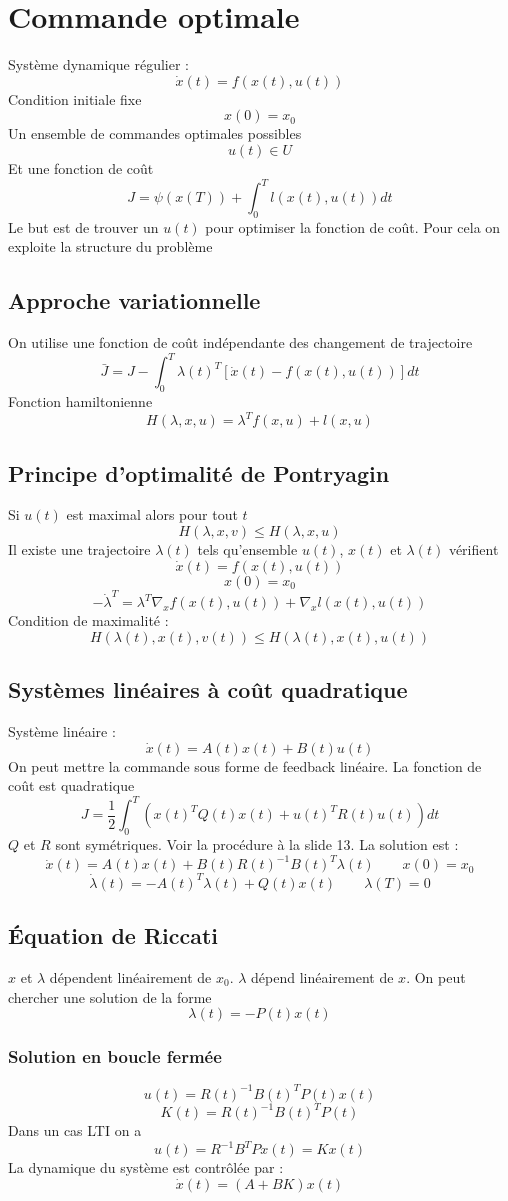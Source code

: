 \documentclass[resume]{subfiles}
\begin{document}
\section{Commande optimale}
Système dynamique régulier :
$$\dot{x}(t)=f(x(t),u(t))$$
Condition initiale fixe
$$x(0)=x_0$$
Un ensemble de commandes optimales possibles
$$u(t)\in U$$
Et une fonction de coût
$$J=\psi(x(T))+\int_{0}^{T}l(x(t),u(t))dt$$
Le but est de trouver un $u(t)$ pour optimiser la fonction de coût. Pour cela on exploite la structure du problème
\subsection{Approche variationnelle}
On utilise une fonction de coût indépendante des changement de trajectoire
$$\bar{J}=J-\int_{0}^{T}\lambda(t)^{T}\left[\dot{x}(t)-f(x(t),u(t))\right]dt$$
Fonction hamiltonienne
$$H(\lambda,x,u)=\lambda^{T}f(x,u)+l(x,u)$$
\subsection{Principe d'optimalité de Pontryagin}
Si $u(t)$ est maximal alors pour tout $t$
$$H(\lambda, x, v)\leq H(\lambda,x,u)$$
Il existe une trajectoire $\lambda(t)$ tels qu'ensemble $u(t)$, $x(t)$ et $\lambda(t)$ vérifient
$$\dot{x}(t)=f(x(t),u(t))$$
$$x(0)=x_0$$
$$-\dot{\lambda}^{T}=\lambda^{T}\nabla_xf(x(t),u(t))+\nabla_xl(x(t),u(t))$$
Condition de maximalité :
$$H(\lambda(t),x(t),v(t))\leq H(\lambda(t),x(t),u(t))$$
\subsection{Systèmes linéaires à coût quadratique}
Système linéaire :
$$\dot{x}(t)=A(t)x(t)+B(t)u(t)$$
On peut mettre la commande sous forme de feedback linéaire. La fonction de coût est quadratique
$$J=\frac{1}{2}\int_{0}^{T}\left(x(t)^{T}Q(t)x(t)+u(t)^{T}R(t)u(t)\right)dt$$
$Q$ et $R$ sont symétriques. Voir la procédure à la slide 13. La solution est :
$$\dot{x}(t)=A(t)x(t)+B(t)R(t)^{-1}B(t)^{T}\lambda(t)\qquad x(0)=x_0$$
$$\dot{\lambda}(t)=-A(t)^{T}\lambda(t)+Q(t)x(t)\qquad \lambda(T)=0$$
\subsection{Équation de Riccati}
$x$ et $\lambda$ dépendent linéairement de $x_0$. $\lambda$ dépend linéairement de $x$. On peut chercher une solution de la forme
$$\lambda(t)=-P(t)x(t)$$
\subsubsection{Solution en boucle fermée}
$$u(t)=R(t)^{-1}B(t)^TP(t)x(t)$$
$$K(t)=R(t)^{-1}B(t)^{T}P(t)$$
Dans un cas LTI on a
$$u(t)=R^{-1}B^{T}Px(t)=Kx(t)$$
La dynamique du système est contrôlée par :
$$\dot{x}(t)=(A+BK)x(t)$$
\end{document}
